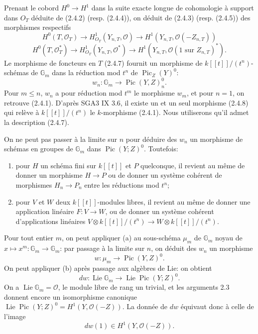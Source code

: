 \documentclass[11pt]{article}
\DeclareMathOperator{\Lie}{Lie}
\DeclareMathOperator{\Pic}{Pic}
\newcommand{\OO}{\mathcal O}
\newcommand{\GG}{\mathbb G}
\begin{document}
Prenant le cobord $H^0\to H^1$ dans la suite exacte longue de cohomologie à support dans $O_T$ déduite de (2.4.2) (resp. (2.4.4)), on déduit de (2.4.3) (resp. (2.4.5)) des morphismes respectifs
\begin{equation}
        H^0(T,\OO_T)\longrightarrow H^1_{O_T}(Y_{n,T},\OO)
        \longrightarrow H^1(Y_{n,T},\OO(-Z_{n,T})) \tag{2.4.6}
\end{equation}
\begin{equation}
        H^0(T,\OO_T^*)\longrightarrow H^1_{O_T}(Y_{n,T},\OO^*)
        \longrightarrow H^1(Y_{n,T},\OO(1\text{ sur }Z_{n,T})^*). \tag{2.4.7}
\end{equation}
Le morphisme de foncteurs en $T$ (2.4.7) fournit un morphisme de $k[[t]]/(t^n)$-schémas de $\GG_m$ dans la réduction mod $t^n$ de $\Pic_Z(Y)^0$:
\begin{equation}
        w_n:\GG_m\longrightarrow \Pic(Y,Z)^0_n. \tag{2.4.8}
\end{equation}
Pour $m\le n$, $w_n$ a pour réduction mod $t^m$ le morphisme $w_m$, et pour $n=1$, on retrouve (2.4.1). D'après SGA3 IX 3.6, il existe un et un seul morphisme (2.4.8) qui relève à $k[[t]]/(t^n)$ le $k$-morphisme (2.4.1). Nous utiliserons qu'il admet la description (2.4.7).

On ne peut pas passer à la limite sur $n$ pour déduire des $w_n$ un morphisme de schémas en groupes de $\GG_m$ dans $\Pic(Y;Z)^0$. Toutefois:
\begin{enumerate}[label=(\alph*)]
\item pour $H$ un schéma fini sur $k[[t]]$ et $P$ quelconque, il revient au même de donner un morphisme $H\to P$ ou de donner un système cohérent de morphismes $H_n\to P_n$ entre les réductions mod $t^n$;
\item pour $V$ et $W$ deux $k[[t]]$-modules libres, il revient au même de donner une application linéaire $F:V\to W$, ou de donner un système cohérent d'applications linéaires $V\otimes k[[t]]/(t^n)\to W\otimes k[[t]]/(t^n)$.
\end{enumerate}
Pour tout entier $m$, on peut appliquer (a) au sous-schéma $\mu_m$ de $\GG_m$ noyau de $x\mapsto x^m:\GG_m\to\GG_m$: par passage à la limite sur $n$, on déduit des $w_n$ un morphisme
\begin{equation}
        w:\mu_m\longrightarrow\Pic(Y,Z)^0. \tag{2.4.9}
\end{equation}
On peut appliquer (b) après passage aux algèbres de Lie: on obtient
\begin{equation}
        dw:\Lie\GG_m\longrightarrow\Lie\Pic(Y;Z)^0. \tag{2.4.10}
\end{equation}
On a $\Lie\GG_m=\OO$, le module libre de rang un trivial, et les arguments 2.3 donnent encore un isomorphisme canonique $\Lie\Pic(Y;Z)^0=H^1(Y,\OO(-Z))$. La donnée de $dw$ équivaut donc à celle de l'image
\begin{equation}
        dw(1)\in H^1(Y,\OO(-Z)). \tag{2.4.11}
\end{equation}
\end{document}
